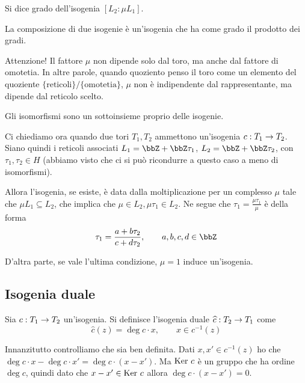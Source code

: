 	\begin{definizione}
		Si dice grado dell'isogenia $[L_2 : \mu L_1]$.
        \end{definizione}

	\begin{osservazione}
		La composizione di due isogenie è un'isogenia che ha come grado il prodotto dei gradi.
	\end{osservazione}

	Attenzione! Il fattore $\mu$ non dipende solo dal toro, ma anche dal fattore di omotetia. In altre parole, quando quoziento penso il toro come un elemento del quoziente $\{ \mbox{reticoli} \} / \{ \mbox{omotetia} \}$, $\mu$ non è indipendente dal rappresentante, ma dipende dal reticolo scelto.

	\begin{osservazione}
		Gli isomorfismi sono un sottoinsieme proprio delle isogenie.
	\end{osservazione}

	Ci chiediamo ora quando due tori $T_1, T_2$ ammettono un'isogenia $c: T_1 \rightarrow T_2$. Siano quindi i reticoli associati $L_1=\bbZ + \bbZ \tau_1$, $L_2=\bbZ + \bbZ \tau_2$, con $\tau_1,\tau_2 \in H$ (abbiamo visto che ci si può ricondurre a questo caso a meno di isomorfismi).

	Allora l'isogenia, se esiste, è data dalla moltiplicazione per un complesso $\mu$ tale che $\mu L_1 \subseteq L_2$, che implica che $\mu \in L_2, \mu\tau_1 \in L_2$. Ne segue che $\tau_1 = \frac{\mu\tau_1}{\mu}$ è della forma
	\[
		\tau_1 = \frac{a + b\tau_2}{c+d\tau_2}, \qquad a,b,c,d \in \bbZ
	\]

	D'altra parte, se vale l'ultima condizione, $\mu=1$ induce un'isogenia.

	\subsection{Isogenia duale}

	Sia $c: T_1 \rightarrow T_2$ un'isogenia. Si definisce l'isogenia duale $\widehat c: T_2 \rightarrow T_1$ come
	\[
		\hat c(z) = \deg c\cdot x, \qquad x \in c^{-1}(z)
	\]

	Innanzitutto controlliamo che sia ben definita. Dati $x, x' \in c^{-1}(z)$ ho che $\deg c \cdot x - \deg c \cdot x' = \deg c \cdot (x-x')$. Ma $\mbox{Ker } c$ è un gruppo che ha ordine $\deg c$, quindi dato che $x-x' \in \mbox{Ker } c$ allora $\deg c \cdot (x-x') = 0$.

